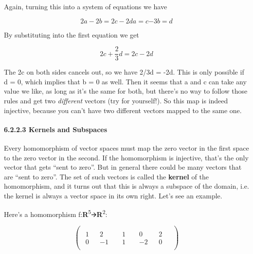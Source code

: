 \documentclass[oneside,english]{amsbook}
\numberwithin{section}{chapter}
\theoremstyle{plain}
\theoremstyle{definition}
\begin{document}
Again, turning this into a system of equations we have

\[{2a - 2b = 2c - 2d
}{a = c
}{- 3b = d}\]

By substituting into the first equation we get

\[2c + \frac{2}{3}d = 2c - 2d\]

The 2c on both sides cancels out, so we have 2/3d = -2d. This is only
possible if d = 0, which implies that b = 0 as well. Then it seems that
a and c can take any value we like, as long as it's the same for both,
but there's no way to follow those rules and get two \emph{different}
vectors (try for yourself!). So this map is indeed injective, because
you can't have two different vectors mapped to the same one.

\paragraph{6.2.2.3 Kernels and Subspaces}\label{kernels-and-subspaces}

Every homomorphism of vector spaces must map the zero vector in the
first space to the zero vector in the second. If the homomorphism is
injective, that's the only vector that gets ``sent to zero''. But in
general there could be many vectors that are ``sent to zero''. The set
of such vectors is called the \textbf{kernel} of the homomorphism, and
it turns out that this is always a subspace of the domain, i.e. the
kernel is always a vector space in its own right. Let's see an example.

Here's a homomorphism
f:\textbf{R}\textsuperscript{5}🡪\textbf{R}\textsuperscript{2}:

\[\begin{pmatrix}
	\begin{matrix}
		1 \\
		0
	\end{matrix} & \begin{matrix}
		2 \\
		- 1
	\end{matrix} & \begin{matrix}
		\begin{matrix}
			1 \\
			1
		\end{matrix} & \begin{matrix}
			\begin{matrix}
				0 \\
				- 2
			\end{matrix} & \begin{matrix}
				2 \\
				0
			\end{matrix}
		\end{matrix}
	\end{matrix}
\end{pmatrix}\]
\end{document}
